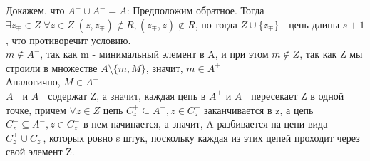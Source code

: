 Докажем, что  $A^+ \cup A^- = A$: Предположим обратное. Тогда $\exists z_{\mp} \in Z \; \forall z \in Z \; (z, z_{\mp}) \not\in R, (z_{\mp}, z) \not\in R$, но тогда $Z \cup \{z_{\mp}\}$ - цепь длины $s + 1$, что противоречит условию.\\
$m \not\in A^-$, так как m - минимальный элемент в A, и при этом $m \not\in Z$, так как Z мы строили в множестве $A \setminus \{m, M\}$, значит, $m \in A^+$\\
Аналогично, $M \in A^-$\\
$A^+$ и $A^-$ содержат Z, а значит, каждая цепь в $A^+$ и $A^-$ пересекает Z в одной точке, причем $\forall z \in Z$ цепь $C^+_z \subseteq A^+, z \in C^+_z$ заканчивается в z, а цепь $C^-_z \subseteq A^-, z \in C^-_z$ в нем начинается, а значит, A разбивается на цепи вида $C^+_z \cup C^-_z$, которых ровно s штук, поскольку каждая из этих цепей проходит через свой элемент Z.
